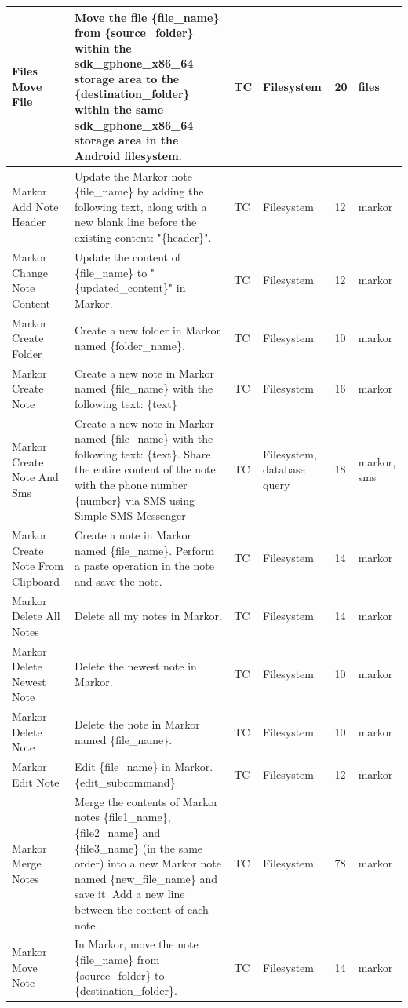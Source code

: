 \documentclass{article}
\begin{document}
\begin{appendices}
\begin{longtable}{>{\RaggedRight\seqsplit}p{.8in}p{2in}p{.3in}p{.5in}p{.3in}p{.5in}}
\midrule
Files Move File & Move the file \{file\_name\} from \{source\_folder\} within the sdk\_gphone\_x86\_64 storage area to the \{destination\_folder\} within the same sdk\_gphone\_x86\_64 storage area in the Android filesystem. & TC & Filesystem & 20 & files \\
\midrule
Markor Add Note Header & Update the Markor note \{file\_name\} by adding the following text, along with a new blank line before the existing content: "\{header\}". & TC & Filesystem & 12 & markor \\
\midrule
Markor Change Note Content & Update the content of \{file\_name\} to "\{updated\_content\}" in Markor. & TC & Filesystem & 12 & markor \\
\midrule
Markor Create Folder & Create a new folder in Markor named \{folder\_name\}. & TC & Filesystem & 10 & markor \\
\midrule
Markor Create Note & Create a new note in Markor named \{file\_name\} with the following text: \{text\} & TC & Filesystem & 16 & markor \\
\midrule
Markor Create Note And Sms & Create a new note in Markor named \{file\_name\} with the following text: \{text\}. Share the entire content of the note with the phone number \{number\} via SMS using Simple SMS Messenger & TC & Filesystem, database query & 18 & markor, sms \\
\midrule
Markor Create Note From Clipboard & Create a note in Markor named \{file\_name\}. Perform a paste operation in the note and save the note. & TC & Filesystem & 14 & markor \\
\midrule
Markor Delete All Notes & Delete all my notes in Markor. & TC & Filesystem & 14 & markor \\
\midrule
Markor Delete Newest Note & Delete the newest note in Markor. & TC & Filesystem & 10 & markor \\
\midrule
Markor Delete Note & Delete the note in Markor named \{file\_name\}. & TC & Filesystem & 10 & markor \\
\midrule
Markor Edit Note & Edit \{file\_name\} in Markor. \{edit\_subcommand\} & TC & Filesystem & 12 & markor \\
\midrule
Markor Merge Notes & Merge the contents of Markor notes \{file1\_name\}, \{file2\_name\} and \{file3\_name\} (in the same order) into a new Markor note named \{new\_file\_name\} and save it. Add a new line between the content of each note. & TC & Filesystem & 78 & markor \\
\midrule
Markor Move Note & In Markor, move the note \{file\_name\} from \{source\_folder\} to \{destination\_folder\}. & TC & Filesystem & 14 & markor \\

\end{longtable}
\end{appendices}
\end{document}
